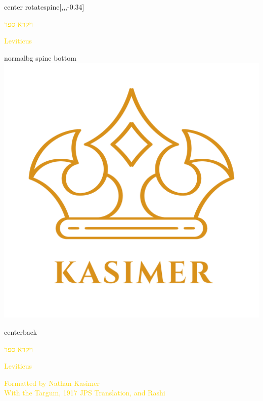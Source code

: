 \documentclass[
coverheight=9.93in,%
coverwidth=7.565in,%
spinewidth=.688in,
bleedwidth=.75in,
marklength=0in,
12pt,
pagecolor=darkblue,
]{bookcover}
\newcommand{\hebtext}[1]{
\begin{hebrew}
	#1
\end{hebrew}
}
\begin{document}
	\begin{bookcover}
	\begin{bookcoverelement}{center rotate}{spine}[,,,-0.34\coverheight]
		\LARGE\textcolor{gold}{\hebtext{ויקרא ספר} \space Leviticus }
	\end{bookcoverelement}
	\begin{bookcoverelement}{normal}{bg spine bottom}
	\includegraphics[width=0.8\spinewidth,height=0.8\spinewidth]{kasimer_logo.png}
	\end{bookcoverelement}

	\begin{bookcoverelement}{center}{back}
		\begin{Huge}
			\textcolor{gold}{\hebtext{ויקרא ספר}}
			
			\textcolor{gold}{Leviticus}
	
		\end{Huge}
		\vspace{2\baselineskip}
		\begin{large}
			\textcolor{gold}{Formatted by Nathan Kasimer\\With the Targum, 1917 JPS Translation, and Rashi}
		\end{large}
	\end{bookcoverelement}
	\end{bookcover}
	
\end{document}
